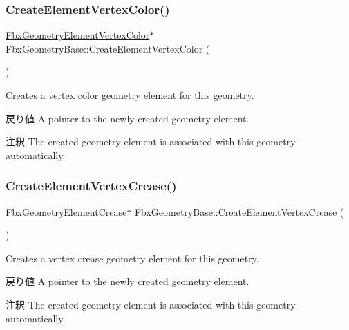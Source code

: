 \subsubsection{\texorpdfstring{Create\+Element\+Vertex\+Color()}{CreateElementVertexColor()}}
{\footnotesize\ttfamily \hyperlink{fbxlayer_8h_a4baddeaf720350758d230973d114f593}{Fbx\+Geometry\+Element\+Vertex\+Color}$\ast$ Fbx\+Geometry\+Base\+::\+Create\+Element\+Vertex\+Color (\begin{DoxyParamCaption}{ }\end{DoxyParamCaption})}

Creates a vertex color geometry element for this geometry. \begin{DoxyReturn}{戻り値}
A pointer to the newly created geometry element. 
\end{DoxyReturn}
\begin{DoxyRemark}{注釈}
The created geometry element is associated with this geometry automatically. 
\end{DoxyRemark}
\mbox{\label{class_fbx_geometry_base_ac31ccf6da5d91b8df915bb1ace15e399}} 
\subsubsection{\texorpdfstring{Create\+Element\+Vertex\+Crease()}{CreateElementVertexCrease()}}
{\footnotesize\ttfamily \hyperlink{fbxlayer_8h_aa1db71d39153856548f192cf52aa2cc5}{Fbx\+Geometry\+Element\+Crease}$\ast$ Fbx\+Geometry\+Base\+::\+Create\+Element\+Vertex\+Crease (\begin{DoxyParamCaption}{ }\end{DoxyParamCaption})}

Creates a vertex crease geometry element for this geometry. \begin{DoxyReturn}{戻り値}
A pointer to the newly created geometry element. 
\end{DoxyReturn}
\begin{DoxyRemark}{注釈}
The created geometry element is associated with this geometry automatically. 
\end{DoxyRemark}
\mbox{\label{class_fbx_geometry_base_a92af07a2d0739a8e27108838c5c7eac4}} 
